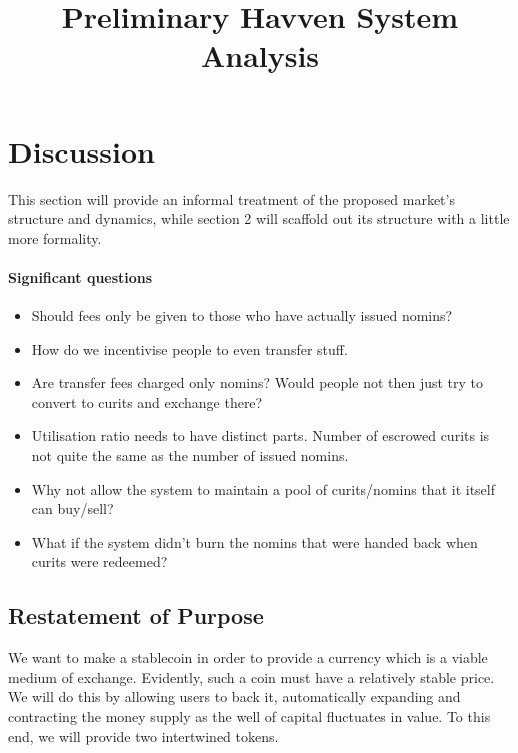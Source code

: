 \documentclass{article}
\begin{document}
\title{Preliminary Havven System Analysis}
\date{}

\begin{figure}
    \centering
    
\end{figure}
\maketitle

\section{Discussion}

This section will provide an informal treatment of the proposed market's structure
and dynamics, while section 2 will scaffold out its structure with a little more
formality.

\paragraph{Significant questions}
\begin{itemize}
    \item Should fees only be given to those who have actually issued nomins?
    \item How do we incentivise people to even transfer stuff.
    \item Are transfer fees charged only nomins? Would people not then just try to convert to curits and exchange there?
    \item Utilisation ratio needs to have distinct parts. Number of escrowed curits is not quite the same as the number of issued nomins.
    \item Why not allow the system to maintain a pool of curits/nomins that it itself can buy/sell?
    \item What if the system didn't burn the nomins that were handed back when curits were redeemed?
\end{itemize}

\pagebreak
\subsection{Restatement of Purpose}
We want to make a stablecoin in order to provide a currency which is a viable medium of exchange.
Evidently, such a coin must have a relatively stable price. We will do this by allowing users to back it,
automatically expanding and contracting the money supply as the well of capital fluctuates in value.
To this end, we will provide two intertwined tokens.
\end{document}
